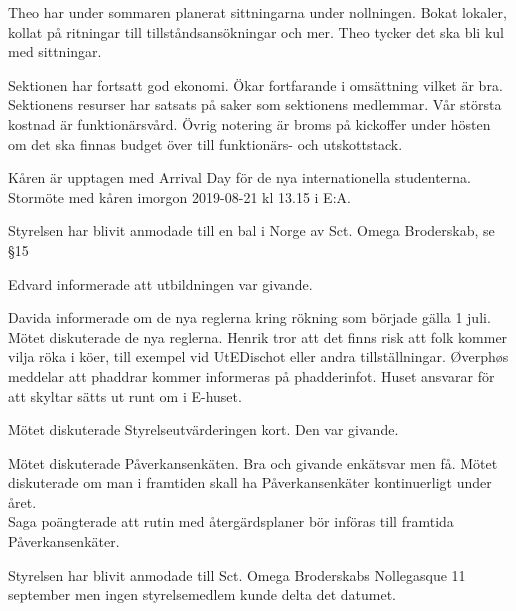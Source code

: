 \documentclass[10pt]{article}
\begin{document}
\begin{paragrafer}
\begin{paragrafer}
Theo har under sommaren planerat sittningarna under nollningen. Bokat lokaler, kollat på ritningar till tillståndsansökningar och mer. 
Theo tycker det ska bli kul med sittningar.

Sektionen har fortsatt god ekonomi. Ökar fortfarande i omsättning vilket är bra. 
Sektionens resurser har satsats på saker som sektionens medlemmar. Vår största kostnad är funktionärsvård.  
Övrig notering är broms på kickoffer under hösten om det ska finnas budget över till funktionärs- och utskottstack. 

Kåren är upptagen med Arrival Day för de nya internationella studenterna.\\
Stormöte med kåren imorgon 2019-08-21 kl 13.15 i E:A.


Styrelsen har blivit anmodade till en bal i Norge av Sct. Omega Broderskab, se \S15

\end{paragrafer}

Edvard informerade att utbildningen var givande. 

Davida informerade om de nya reglerna kring rökning som började gälla 1 juli. Mötet diskuterade de nya reglerna. Henrik tror att det finns risk att folk kommer vilja röka i köer, till exempel vid UtEDischot eller andra tillställningar. 
Øverphøs meddelar att phaddrar kommer informeras på phadderinfot. Huset ansvarar för att skyltar sätts ut runt om i E-huset.


Mötet diskuterade Styrelseutvärderingen kort. Den var givande. 


Mötet diskuterade Påverkansenkäten. Bra och givande enkätsvar men få. Mötet diskuterade om man i framtiden skall ha Påverkansenkäter kontinuerligt under året. \\
Saga poängterade att rutin med återgärdsplaner bör införas till framtida Påverkansenkäter. 



Styrelsen har blivit anmodade till Sct. Omega Broderskabs Nollegasque 11 september men ingen styrelsemedlem kunde delta det datumet. 


\end{paragrafer}
\end{document}
